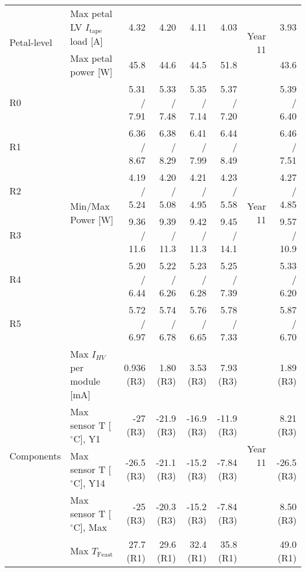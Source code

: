 \begin{table}[ht]
\begin{subtable}[t]{.99\linewidth}
\begin{centering}
{\begin{tabular}{|l|l|r|r|r|r|r|r|}
\multirow{2}{*}{Petal-level}    & Max petal LV $I_\text{tape}$ load [A]        &          4.32 &          4.20 &          4.11 &          4.03 & \multirow{2}{*}{Year 11} &          3.93 \\ 
                                & Max petal power [W]                          &          45.8 &          44.6 &          44.5 &          51.8 &  &          43.6 \\ \hline
R0                              & \multirow{6}{*}{Min/Max Power [W]}           &   5.31 / 7.91 &   5.33 / 7.48 &   5.35 / 7.14 &   5.37 / 7.20 & \multirow{6}{*}{Year 11} &   5.39 / 6.40 \\ 
R1                              &                                              &   6.36 / 8.67 &   6.38 / 8.29 &   6.41 / 7.99 &   6.44 / 8.49 &  &   6.46 / 7.51 \\ 
R2                              &                                              &   4.19 / 5.24 &   4.20 / 5.08 &   4.21 / 4.95 &   4.23 / 5.58 &  &   4.27 / 4.85 \\ 
R3                              &                                              &   9.36 / 11.6 &   9.39 / 11.3 &   9.42 / 11.3 &   9.45 / 14.1 &  &   9.57 / 10.9 \\ 
R4                              &                                              &   5.20 / 6.44 &   5.22 / 6.26 &   5.23 / 6.28 &   5.25 / 7.39 &  &   5.33 / 6.20 \\ 
R5                              &                                              &   5.72 / 6.97 &   5.74 / 6.78 &   5.76 / 6.65 &   5.78 / 7.33 &  &   5.87 / 6.70 \\ \hline
\multirow{5}{*}{Components}     & Max $I_{HV}$ per module [mA]                 &    0.936 (R3) &     1.80 (R3) &     3.53 (R3) &     7.93 (R3) & \multirow{5}{*}{Year 11} &     1.89 (R3) \\ 
                                & Max sensor T [$^\circ$C], Y1                 &      -27 (R3) &    -21.9 (R3) &    -16.9 (R3) &    -11.9 (R3) &  &     8.21 (R3) \\ 
                                & Max sensor T [$^\circ$C], Y14                &    -26.5 (R3) &    -21.1 (R3) &    -15.2 (R3) &    -7.84 (R3) &  &    -26.5 (R3) \\ 
                                & Max sensor T [$^\circ$C], Max                &      -25 (R3) &    -20.3 (R3) &    -15.2 (R3) &    -7.84 (R3) &  &     8.50 (R3) \\ 
                                & Max $T_\text{Feast}$                         &     27.7 (R1) &     29.6 (R1) &     32.4 (R1) &     35.8 (R1) &  &     49.0 (R1) \\ \hline

\end{tabular}}
\end{centering}
\end{subtable}
\end{table}
